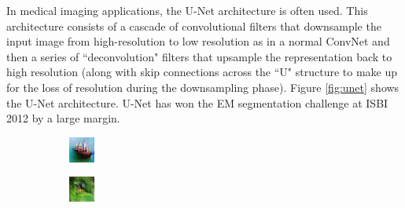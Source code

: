 In medical imaging applications, the U-Net architecture is often used. This architecture consists of a cascade of convolutional filters that downsample the input image from high-resolution to low resolution as in a normal ConvNet and then a series of ``deconvolution" filters that upsample the representation back to high resolution (along with skip connections across the ``U" structure to make up for the loss of resolution during the downsampling phase). Figure \ref{fig:unet} shows the U-Net architecture. U-Net has won the EM segmentation challenge at ISBI 2012 by a large margin.

\begin{figure}[h]
    \centering
    \begin{subfigure}{0.25\textwidth}
    \includegraphics[width=0.9\linewidth]{lectures/05-a/checkerboard0.png} 
    \end{subfigure}
    \begin{subfigure}{0.25\textwidth}
    \includegraphics[width=0.9\linewidth]{lectures/05-a/checkerboard1.png}

\end{subfigure}
\end{figure}
